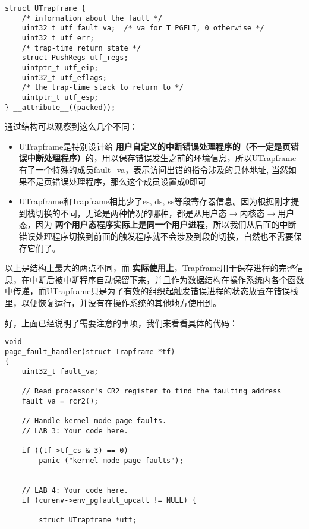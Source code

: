 \documentclass{article}
\newcommand{\highlight}[1]{{\bfseries \color{red}  #1}}
\begin{document}
\begin{CJK*}{UTF8}{gkai}
\begin{description}
\begin{lstlisting}[style=ccode, firstnumber=56, title={\scriptsize \ttfamily \bfseries inc/trap.h}]
struct UTrapframe {
	/* information about the fault */
	uint32_t utf_fault_va;	/* va for T_PGFLT, 0 otherwise */
	uint32_t utf_err;
	/* trap-time return state */
	struct PushRegs utf_regs;
	uintptr_t utf_eip;
	uint32_t utf_eflags;
	/* the trap-time stack to return to */
	uintptr_t utf_esp;
} __attribute__((packed));
\end{lstlisting}

通过结构可以观察到这么几个不同：

\begin{itemize}
\item{UTrapframe是特别设计给\highlight{用户自定义的中断错误处理程序的（不一定是页错误中断处理程序）}的，用以保存错误发生之前的环境信息，所以UTrapframe有了一个特殊的成员fault\_va，表示访问出错的指令涉及的具体地址, 当然如果不是页错误处理程序，那么这个成员设置成0即可}
\item{UTrapframe和Trapframe相比少了es, ds, ss等段寄存器信息。因为根据刚才提到栈切换的不同，无论是两种情况的哪种，都是从用户态$\longrightarrow$内核态$\longrightarrow$用户态，因为\highlight{两个用户态程序实际上是同一个用户进程}，所以我们从后面的中断错误处理程序切换到前面的触发程序就不会涉及到段的切换，自然也不需要保存它们了。}
\end{itemize}

以上是结构上最大的两点不同，而\highlight{实际使用上}，Trapframe用于保存进程的完整信息，在中断后被中断程序自动保留下来，并且作为数据结构在操作系统内各个函数中传递，而UTrapframe只是为了有效的组织起触发错误进程的状态放置在错误栈里，以便恢复运行，并没有在操作系统的其他地方使用到。

\end{description}

好，上面已经说明了需要注意的事项，我们来看看具体的代码：

\begin{lstlisting}[style=ccode, title={\scriptsize \ttfamily \bfseries kern/trap.c: page\_fault\_handler()}]
void
page_fault_handler(struct Trapframe *tf)
{
    uint32_t fault_va;

    // Read processor's CR2 register to find the faulting address
    fault_va = rcr2();

    // Handle kernel-mode page faults.
    // LAB 3: Your code here.

    if ((tf->tf_cs & 3) == 0)
        panic ("kernel-mode page faults");
 

    // LAB 4: Your code here.
    if (curenv->env_pgfault_upcall != NULL) {

        struct UTrapframe *utf;


\end{lstlisting}
\end{CJK*}
\end{document}
